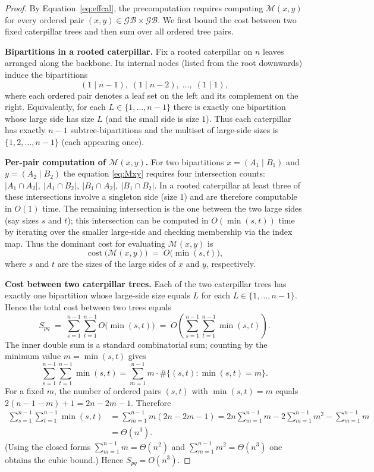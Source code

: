 \documentclass[10pt,a4paper]{article}
\begin{document}
\begin{proof}
By Equation~\eqref{eq:effcal}, the precomputation requires computing
\(\mathcal{M}(x,y)\) for every ordered pair \((x,y)\in\mathcal{GB}\times\mathcal{GB}\).
We first bound the cost between two fixed caterpillar trees and then sum
over all ordered tree pairs.

\medskip\noindent\textbf{Bipartitions in a rooted caterpillar.}
Fix a rooted caterpillar on \(n\) leaves arranged along the backbone.
Its internal nodes (listed from the root downwards) induce the bipartitions
\[
(1 \mid n-1),\; (1 \mid n-2),\; \dots,\; (1 \mid 1),
\]
where each ordered pair denotes a leaf set on the left and its complement
on the right. Equivalently, for each \(L\in\{1,\dots,n-1\}\) there is
exactly one bipartition whose large side has size \(L\) (and the
small side is size \(1\)). Thus each caterpillar has exactly \(n-1\)
subtree-bipartitions and the multiset of large-side sizes is
\(\{1,2,\dots,n-1\}\) (each appearing once).

\medskip\noindent\textbf{Per-pair computation of \(\mathcal{M}(x,y)\).}
For two bipartitions
\(x=(A_1\mid B_1)\) and \(y=(A_2\mid B_2)\) the equation
\eqref{eq:Mxy} requires four intersection counts:
\(|A_1\cap A_2|,\ |A_1\cap B_2|,\ |B_1\cap A_2|,\ |B_1\cap B_2|\).
In a rooted caterpillar at least three of these intersections involve a
singleton side (size \(1\)) and are therefore computable in \(O(1)\) time. The remaining intersection is the
one between the two large sides (say sizes \(s\) and \(t\)); this
intersection can be computed in \(O(\min(s,t))\) time by iterating over
the smaller large-side and checking membership via the index map. Thus
the dominant cost for evaluating \(\mathcal{M}(x,y)\) is
\[
\operatorname{cost}\big(\mathcal{M}(x,y)\big) \;=\; O\!\big(\min(s,t)\big),
\]
where \(s\) and \(t\) are the sizes of the large sides of \(x\) and \(y\),
respectively.

\medskip\noindent\textbf{Cost between two caterpillar trees.}
Each of the two caterpillar trees has exactly one bipartition whose
large-side size equals \(L\) for each \(L\in\{1,\dots,n-1\}\). Hence the
total cost between two trees equals
\[
S_{pq} \;=\; \sum_{s=1}^{n-1}\sum_{t=1}^{n-1} O\!\big(\min(s,t)\big)
\;=\; O\!\left(\sum_{s=1}^{n-1}\sum_{t=1}^{n-1}\min(s,t)\right).
\]
The inner double sum is a standard combinatorial sum; counting by the
minimum value \(m=\min(s,t)\) gives
\[
\sum_{s=1}^{n-1}\sum_{t=1}^{n-1}\min(s,t)
= \sum_{m=1}^{n-1} m\cdot\#\{(s,t):\min(s,t)=m\}.
\]
For a fixed \(m\), the number of ordered pairs \((s,t)\) with
\(\min(s,t)=m\) equals \(2(n-1-m)+1 = 2n-2m-1\). Therefore
\begin{align*}
\sum_{s=1}^{n-1}\sum_{t=1}^{n-1}\min(s,t)
&= \sum_{m=1}^{n-1} m(2n-2m-1)
= 2n\sum_{m=1}^{n-1} m - 2\sum_{m=1}^{n-1} m^2 - \sum_{m=1}^{n-1} m \\
&= \Theta(n^3).
\end{align*}
(Using the closed forms \(\sum_{m=1}^{n-1} m = \Theta(n^2)\) and
\(\sum_{m=1}^{n-1} m^2 = \Theta(n^3)\) one obtains the cubic bound.)
Hence \(S_{pq} = O(n^3)\).


\end{proof}
\end{document}
